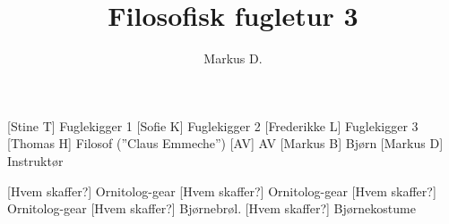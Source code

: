 \documentclass[a4paper,12pt]{article}
\title{Filosofisk fugletur 3}
\author{Markus D.}
\begin{document}
\maketitle




\begin{roles}
	[Stine T] Fuglekigger 1
	[Sofie K] Fuglekigger 2
	[Frederikke L] Fuglekigger 3
	[Thomas H] Filosof (''Claus Emmeche'')
	[AV] AV
	[Markus B] Bjørn
		[Markus D] Instruktør
\end{roles}


\begin{props}
	[Hvem skaffer?] Ornitolog-gear
	[Hvem skaffer?] Ornitolog-gear
	[Hvem skaffer?] Ornitolog-gear
	[Hvem skaffer?] Bjørnebrøl.
	[Hvem skaffer?] Bjørnekostume
\end{props}
\end{document}
